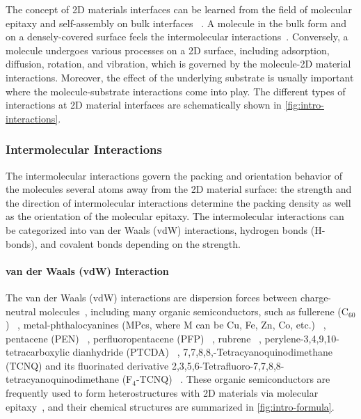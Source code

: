 The concept of 2D materials interfaces can be
learned from the field of molecular epitaxy and self-assembly on bulk
interfaces
~\autocite{Kowarik_2008_rev_MBE,Barth_2007,Whitesides_2002_assem_rev,Philips_2D_assem_book}.
% 
A molecule in the bulk form and on a densely-covered surface feels the
intermolecular interactions~\autocite{Israelachvili_2011_book}.
%
Conversely, a molecule undergoes various
processes on a 2D surface, including adsorption, diffusion, rotation,
and vibration, which is governed by the molecule-2D material
interactions.
%
Moreover, the effect of the underlying substrate is
usually important where the molecule-substrate interactions come into
play.
%
The different types of interactions at 2D material interfaces are
schematically shown in \autoref{fig:intro-interactions}.

\subsubsection{Intermolecular Interactions}
\label{sec:intro-inter-mole}

The intermolecular interactions govern the packing and orientation
behavior of the molecules several atoms away from the 2D material
surface: the strength and the direction of intermolecular interactions
determine the packing density as well as the orientation of the
molecular epitaxy. The intermolecular interactions can be categorized 
into van der Waals (vdW) interactions, hydrogen bonds (H-bonds), and
covalent bonds depending on the strength. 

\paragraph{van der Waals (vdW) Interaction}

The van der Waals (vdW) interactions are dispersion forces between
charge-neutral molecules~\autocite{Israelachvili_2011_book}, including
many organic semiconductors, such as fullerene (C\(_{\text{60}}\))
~\autocite{Corso_2004_C60_hBN,Kim_2015_c60_gr,Chen_2016_c60_mos2},
metal-phthalo\-cyanines (MPcs, where M can be Cu, Fe, Zn, Co, etc.)
~\autocite{Xiao_2013_jacs_CuPc_gr,Wang_2010_selec_F16_gr,Zhang_2011_FePc_gr,Hamalainen_2012_CoPc_gr_Ir,Ying_Mao_2011_ge_clAlPc,Ogawa_2013_AlCiPc_gr,Pak_2015_CuPc_MoS2,Avvisati_2017_FePc_intercal,Iannuzzi_2014_MPc_hBN_Rh},
pentacene (PEN)
~\autocite{Lee_2011_pentacene,Jariwala_2016_Mos2_pentacene,Shen_2017_DFT_mos2_pent,Kim_2016_trap_Mos2_pent,Nguyen_2015_pent_gr_wett,Betti_2007_orien_pentacene},
perfluoropentacene (PFP)
~\autocite{Salzmann_2012_fpen_gr,Breuer_2016_acnene_mos2}, rubrene
~\autocite{Lee_2014_rubene_hBN}, perylene-3,4,9,10-tetra\-carboxylic
dianhydride (PTCDA)
~\autocite{Wang_2009_STM_PTCDA_Gr,Tian_2010_PTCDA_gr,Huang_2009_PTCDA_gr,Meissner_2012_PTCDA_BLG},
7,7,8,8,-Tetra\-cyanoquino\-dimethane (TCNQ) and its fluorinated
derivative 2,3,5,6-Tetra\-fluoro-7,7,8,8-tetra\-cyanoquino\-dimethane
(F\(_{\text{4}}\)-TCNQ)
~\autocite{Chen_2007_tcnq_gr_transfer,Hong_2013_ftcnq_gr,Stradi_2014_TCNQ_gr_Ru,Tsai_2015_TCNQ_gr_hbn}. These
organic semiconductors are frequently used to form heterostructures
with 2D materials via molecular epitaxy~\autocite{Hara_1989_ME}, and their chemical structures are summarized in \autoref{fig:intro-formula}.

